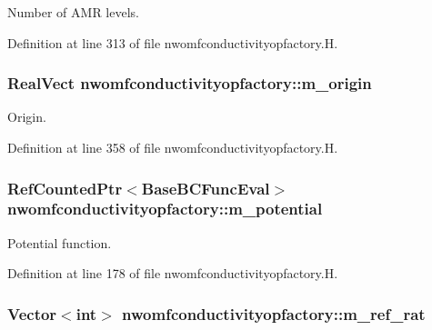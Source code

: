 Number of A\+MR levels. 



Definition at line 313 of file nwomfconductivityopfactory.\+H.

\subsubsection[{\texorpdfstring{m\+\_\+origin}{m_origin}}]{\setlength{\rightskip}{0pt plus 5cm}Real\+Vect nwomfconductivityopfactory\+::m\+\_\+origin\hspace{0.3cm}{\ttfamily [protected]}}\hypertarget{classnwomfconductivityopfactory_af6fa637cb82676bf6d1f98758cc72291}{}\label{classnwomfconductivityopfactory_af6fa637cb82676bf6d1f98758cc72291}


Origin. 



Definition at line 358 of file nwomfconductivityopfactory.\+H.

\subsubsection[{\texorpdfstring{m\+\_\+potential}{m_potential}}]{\setlength{\rightskip}{0pt plus 5cm}Ref\+Counted\+Ptr$<$Base\+B\+C\+Func\+Eval$>$ nwomfconductivityopfactory\+::m\+\_\+potential\hspace{0.3cm}{\ttfamily [protected]}}\hypertarget{classnwomfconductivityopfactory_aa49cb695d778559971ee983223628782}{}\label{classnwomfconductivityopfactory_aa49cb695d778559971ee983223628782}


Potential function. 



Definition at line 178 of file nwomfconductivityopfactory.\+H.

\subsubsection[{\texorpdfstring{m\+\_\+ref\+\_\+rat}{m_ref_rat}}]{\setlength{\rightskip}{0pt plus 5cm}Vector$<$int$>$ nwomfconductivityopfactory\+::m\+\_\+ref\+\_\+rat\hspace{0.3cm}{\ttfamily [protected]}}\hypertarget{classnwomfconductivityopfactory_a524dda23094a7f925b292da49a253143}{}\label{classnwomfconductivityopfactory_a524dda23094a7f925b292da49a253143}


